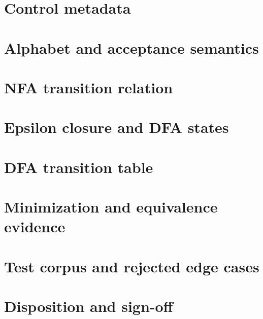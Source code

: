 \documentclass[11pt,letterpaper]{article}
\begin{document}
\makedoctitle\makedocsummary
\section{Control metadata}
\section{Alphabet and acceptance semantics}
\section{NFA transition relation}
\section{Epsilon closure and DFA states}
\section{DFA transition table}
\section{Minimization and equivalence evidence}
\section{Test corpus and rejected edge cases}
\section{Disposition and sign-off}
\end{document}
